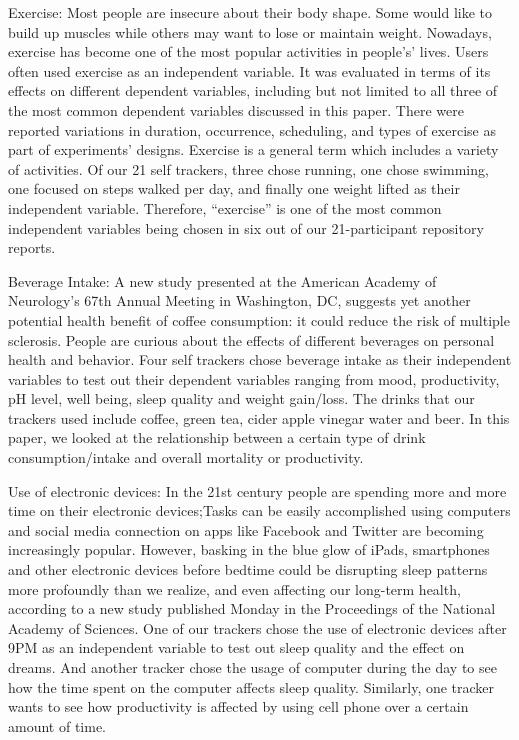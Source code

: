 Exercise:
Most people are insecure about their body shape. Some would like to build up muscles while others may want to lose or maintain weight. Nowadays, exercise has become one of the most popular activities in people's’ lives. Users often used exercise as an independent variable. It was evaluated in terms of its effects on different dependent variables, including but not limited to all three of the most common dependent variables discussed in this paper. There were reported variations in duration, occurrence, scheduling, and types of exercise as part of experiments’ designs. Exercise is a general term which includes a variety of activities. Of our 21 self trackers, three chose running, one chose swimming, one focused on steps walked per day, and finally one weight lifted as their independent variable. Therefore, “exercise” is one of the most common independent variables being chosen in six out of our 21-participant repository reports.
 
Beverage Intake:
A new study presented at the American Academy of Neurology's 67th Annual Meeting in Washington, DC, suggests yet another potential health benefit of coffee consumption: it could reduce the risk of multiple sclerosis. People are curious about the effects of different beverages on personal health and behavior. Four self trackers chose beverage intake as their independent variables to test out their dependent variables ranging from mood, productivity, pH level, well being, sleep quality and weight gain/loss. The drinks that our trackers used include coffee, green tea, cider apple vinegar water and beer. In this paper, we looked at the relationship between a certain type of drink consumption/intake and overall mortality or productivity.
 
Use of electronic devices:
In the 21st century people are spending more and more time on their electronic devices;Tasks can be easily accomplished using computers and social media connection on apps like Facebook and Twitter are becoming increasingly popular. However, basking in the blue glow of iPads, smartphones and other electronic devices before bedtime could be disrupting sleep patterns more profoundly than we realize, and even affecting our long-term health, according to a new study published Monday in the Proceedings of the National Academy of Sciences. One of our trackers chose the use of electronic devices after 9PM as an independent variable to test out sleep quality and the effect on dreams. And another tracker chose the usage of computer during the day to see how the time spent on the computer affects sleep quality. Similarly, one tracker wants to see how productivity is affected by using cell phone over a certain amount of time.
 
